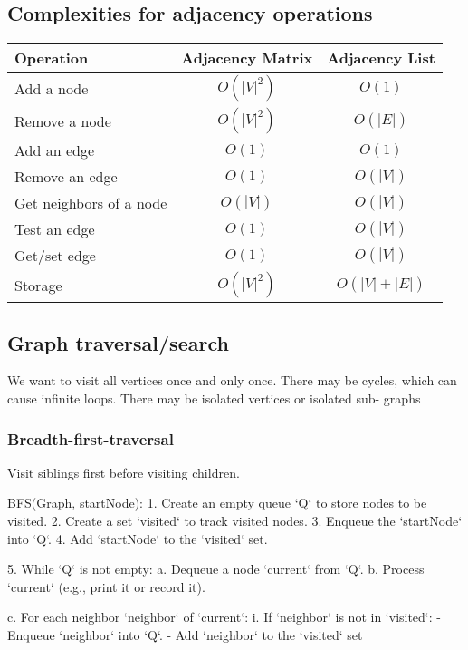 \documentclass{report}
\begin{document}
\bigbreak \noindent 
\subsection{Complexities for adjacency operations}
\bigbreak \noindent 
\begin{center}
    \begin{tabular}{|l|c|c|}
        \hline
        \textbf{Operation}               & \textbf{Adjacency Matrix} & \textbf{Adjacency List} \\ \hline
        Add a node                       & \(O(|V|^2)\)             & \(O(1)\)               \\ \hline
        Remove a node                    & \(O(|V|^2)\)             & \(O(|E|)\)             \\ \hline
        Add an edge                      & \(O(1)\)                 & \(O(1)\)               \\ \hline
        Remove an edge                   & \(O(1)\)                 & \(O(|V|)\)             \\ \hline
        Get neighbors of a node          & \(O(|V|)\)               & \(O(|V|)\)             \\ \hline
        Test an edge                     & \(O(1)\)                 & \(O(|V|)\)             \\ \hline
        Get/set edge                     & \(O(1)\)                 & \(O(|V|)\)             \\ \hline
        Storage                          & \(O(|V|^2)\)             & \(O(|V| + |E|)\)       \\ \hline
    \end{tabular}
\end{center}

\bigbreak \noindent 
\subsection{Graph traversal/search}
\bigbreak \noindent 
We want to visit all vertices once and only once. There may be cycles, which can cause infinite loops. There may be isolated vertices or isolated sub- graphs
\bigbreak \noindent 
\subsubsection{Breadth-first-traversal}
\bigbreak \noindent 
Visit siblings first before visiting children.
\bigbreak \noindent 
\begin{cppcode}
BFS(Graph, startNode):
    1. Create an empty queue `Q` to store nodes to be visited.
    2. Create a set `visited` to track visited nodes.
    3. Enqueue the `startNode` into `Q`.
    4. Add `startNode` to the `visited` set.

    5. While `Q` is not empty:
        a. Dequeue a node `current` from `Q`.
        b. Process `current` (e.g., print it or record it).

        c. For each neighbor `neighbor` of `current`:
            i. If `neighbor` is not in `visited`:
                - Enqueue `neighbor` into `Q`.
                - Add `neighbor` to the `visited` set
\end{cppcode}
\end{document}
